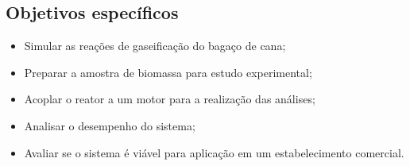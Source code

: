 \subsection{Objetivos específicos}
\begin{itemize}
\item Simular as reações de gaseificação do bagaço de cana;

\item Preparar a amostra de biomassa para estudo experimental;

\item Acoplar o reator a um motor para a realização das análises;

\item Analisar o desempenho do sistema;

\item Avaliar se o sistema é viável para aplicação em um estabelecimento comercial.
\end{itemize}



